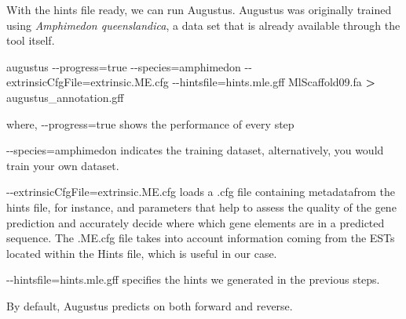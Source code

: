 \documentclass[
]{article}
\newenvironment{Shaded}{\begin{snugshade}}{\end{snugshade}}
\newcommand{\ExtensionTok}[1]{#1}
\newcommand{\NormalTok}[1]{#1}
\newcommand{\OperatorTok}[1]{\textcolor[rgb]{0.81,0.36,0.00}{\textbf{#1}}}
\begin{document}
With the hints file ready, we can run Augustus. Augustus was originally
trained using \emph{Amphimedon queenslandica}, a data set that is
already available through the tool itself.

\begin{Shaded}
\begin{Highlighting}[]

\ExtensionTok{augustus}\NormalTok{ {-}{-}progress=true {-}{-}species=amphimedon {-}{-}extrinsicCfgFile=extrinsic.ME.cfg {-}{-}hintsfile=hints.mle.gff MlScaffold09.fa }\OperatorTok{\textgreater{}}\NormalTok{ augustus\_annotation.gff}

\ExtensionTok{where}\NormalTok{,}
\ExtensionTok{{-}{-}progress}\NormalTok{=true shows the performance of every step}

\ExtensionTok{{-}{-}species}\NormalTok{=amphimedon indicates the training dataset, alternatively, you would train your own dataset.}

\ExtensionTok{{-}{-}extrinsicCfgFile}\NormalTok{=extrinsic.ME.cfg loads a .cfg file containing metadatafrom the hints file, for instance, and parameters that help to assess the quality of the gene prediction and accurately decide where which gene elements are in a predicted sequence. The .ME.cfg file takes into account information coming from the ESTs located within the Hints file, which is useful in our case.}

\ExtensionTok{{-}{-}hintsfile}\NormalTok{=hints.mle.gff specifies the hints we generated in the previous steps.}

\ExtensionTok{By}\NormalTok{ default, Augustus predicts on both forward and reverse.}
\end{Highlighting}
\end{Shaded}
\end{document}
